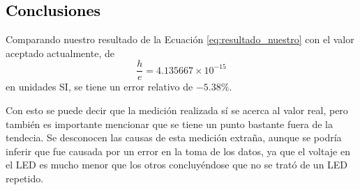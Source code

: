 \textcolor{black}{\section{Conclusiones}}

\noindent Comparando nuestro resultado de la Ecuación \ref{eq:resultado_nuestro} con el valor aceptado actualmente, de
\begin{equation*}
	\frac{h}{e} = 4.135667 \times10^{-15}
\end{equation*}
en unidades SI, se tiene un error relativo de $-5.38\%$.

Con esto se puede decir que la medición realizada sí se acerca al valor real, pero también es importante mencionar que se tiene un punto bastante fuera de la tendecia. Se desconocen las causas de esta medición extraña, aunque se podría inferir que fue causada por un error en la toma de los datos, ya que el voltaje en el LED es mucho menor que los otros concluyéndose que no se trató de un LED repetido.